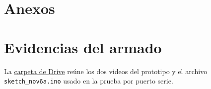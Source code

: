 \documentclass[10pt,twocolumn]{article}
\newcommand{\code}[1]{\texttt{\small #1}}
\begin{document}
\section*{Anexos}
\appendix
{}
\section{Evidencias del armado}
\label{anexo:evidencias-armado}

La \href{https://drive.google.com/drive/folders/1GaprwriotHJuRfBhnqh_3qpv-3r5A804?usp=sharing}{carpeta de Drive}
reúne los dos videos del prototipo y el archivo \code{sketch\_nov6a.ino}
usado en la prueba por puerto serie.
\end{document}
